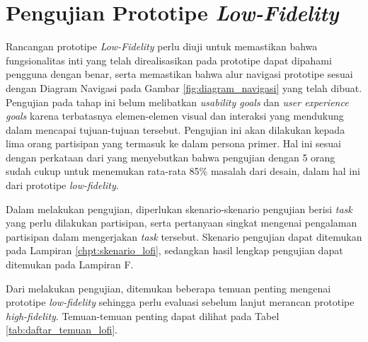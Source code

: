 \section{Pengujian Prototipe \textit{Low-Fidelity}}
Rancangan prototipe \textit{Low-Fidelity} perlu diuji untuk memastikan bahwa fungsionalitas inti yang telah direalisasikan pada prototipe dapat dipahami pengguna dengan benar, serta memastikan bahwa alur navigasi prototipe sesuai dengan Diagram Navigasi pada Gambar \ref{fig:diagram_navigasi} yang telah dibuat. Pengujian pada tahap ini belum melibatkan \textit{usability goals} dan \textit{user experience goals} karena terbatasnya elemen-elemen visual dan interaksi yang mendukung dalam mencapai tujuan-tujuan tersebut. Pengujian ini akan dilakukan kepada lima orang partisipan yang termasuk ke dalam persona primer. Hal ini sesuai dengan perkataan dari \textcite{nielsenusabilityproblems} yang menyebutkan bahwa pengujian dengan 5 orang sudah cukup untuk menemukan rata-rata 85\% masalah dari desain, dalam hal ini dari prototipe \textit{low-fidelity}.


Dalam melakukan pengujian, diperlukan skenario-skenario pengujian berisi \textit{task} yang perlu dilakukan partisipan, serta pertanyaan singkat mengenai pengalaman partisipan dalam mengerjakan \textit{task} tersebut. Skenario pengujian dapat ditemukan pada Lampiran \ref{chpt:skenario_lofi}, sedangkan hasil lengkap pengujian dapat ditemukan pada Lampiran F.

Dari melakukan pengujian, ditemukan beberapa temuan penting mengenai prototipe \textit{low-fidelity} sehingga perlu evaluasi sebelum lanjut merancan prototipe \textit{high-fidelity}. Temuan-temuan penting dapat dilihat pada Tabel \ref{tab:daftar_temuan_lofi}.

\newcommand{\cditem}[1]{\colorbox{white}{\raisebox{7pt}{\begin{minipage}[t]{0.7\textwidth}\linespread{1}\selectfont \begin{itemize}[parsep=0pt, leftmargin=*] #1 \end{itemize} \end{minipage}}}}

